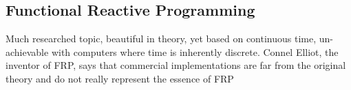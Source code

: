 
\subsection{Functional Reactive Programming}
\label{frp}
Much researched topic, beautiful in theory, yet based on continuous time, un-achievable with computers where time is inherently discrete. Connel Elliot, the inventor of FRP, says that commercial implementations are far from the original theory and do not really represent the essence of FRP